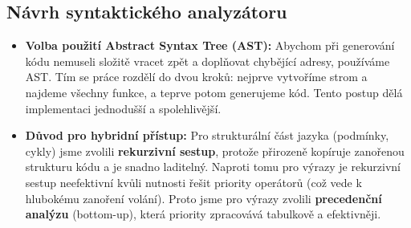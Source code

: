 \subsection{Návrh syntaktického analyzátoru}


\begin{itemize}
    \item \textbf{Volba použití Abstract Syntax Tree (AST):}
    Abychom při generování kódu nemuseli složitě vracet zpět a doplňovat chybějící adresy, používáme AST. Tím se práce rozdělí do dvou kroků: nejprve vytvoříme strom a najdeme všechny funkce, a teprve potom generujeme kód. Tento postup dělá implementaci jednodušší a spolehlivější.

    \item \textbf{Důvod pro hybridní přístup:}
    Pro strukturální část jazyka (podmínky, cykly) jsme zvolili \textbf{rekurzivní sestup}, protože přirozeně kopíruje zanořenou strukturu kódu a je snadno laditelný.
    Naproti tomu pro výrazy je rekurzivní sestup neefektivní kvůli nutnosti řešit priority operátorů (což vede k hlubokému zanoření volání). Proto jsme pro výrazy zvolili \textbf{precedenční analýzu} (bottom-up), která priority zpracovává tabulkově a efektivněji.

\end{itemize}

